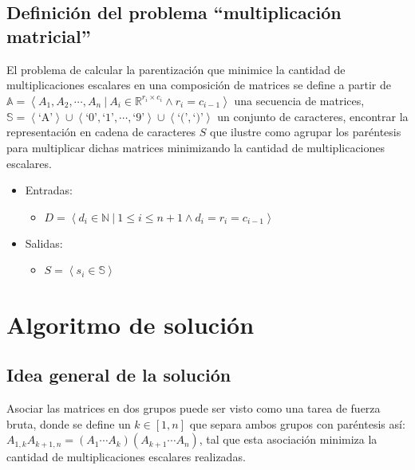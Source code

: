 \documentclass[letter]{article}
\begin{document}
\subsection{Definición del problema ``multiplicación matricial''} \label{formalizacion:definicion}

El problema de calcular la parentización que minimice la cantidad de multiplicaciones escalares en una composición de matrices se define a partir de $\mathbb{A}=\left< A_1, A_2, \cdots, A_n  ~|~ A_i \in \mathbb{R}^{r_i \times c_i} \land r_i = c_{i-1} \right>$ una secuencia de matrices, $\mathbb{S} = \left< \text{`A'} \right> \cup \left< \text{`0'}, \text{`1'}, \cdots, \text{`9'} \right> \cup \left< \text{`('}, \text{`)'} \right>$ un conjunto de caracteres, encontrar la representación en cadena de caracteres $S$ que ilustre como agrupar los paréntesis para multiplicar dichas matrices minimizando la cantidad de multiplicaciones escalares. \par

\begin{itemize}
    \item Entradas:
    \begin{itemize}
        \item $D = \left< d_i \in \mathbb{N} ~|~ 1 \leq i \leq n + 1 \land d_i = r_i = c_{i-1} \right>$
    \end{itemize}
    \item Salidas:
    \begin{itemize}
        \item $S = \left< s_i \in \mathbb{S} \right>$
    \end{itemize}
\end{itemize}

\section{Algoritmo de solución} \label{algoritmo}

\subsection{Idea general de la solución} \label{algoritmo:idea}

Asociar las matrices en dos grupos puede ser visto como una tarea de fuerza bruta, donde se define un $k \in [1, n]$ que separa ambos grupos con paréntesis así: $A_{1,k} A_{k+1,n}=(A_1 \cdots A_k)(A_{k+1} \cdots A_n)$, tal que esta asociación minimiza la cantidad de multiplicaciones escalares realizadas. \par
\end{document}
